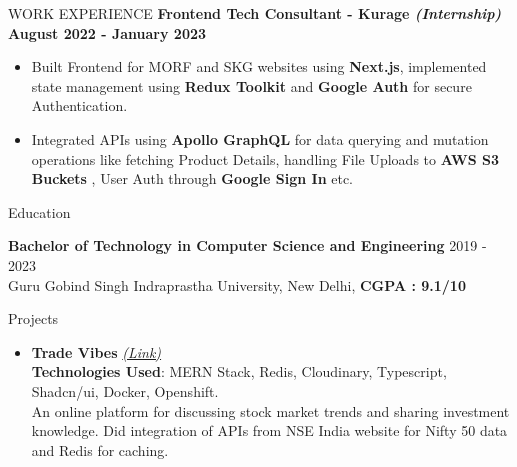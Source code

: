 \documentclass{resume} %
\begin{document}
\begin{rSection}{WORK EXPERIENCE}
{\bf Frontend Tech Consultant - Kurage {\normalfont \emph{(Internship)}}  \hfill August 2022 - January 2023 }
\begin{itemize}

    \item {\normalfont Built Frontend for MORF and SKG websites using \textbf{Next.js}, implemented state management using 
 \textbf{Redux Toolkit} and \textbf{Google Auth} for secure Authentication.}
   \item {\normalfont Integrated APIs using \textbf{{Apollo GraphQL}} for data querying and mutation operations like fetching Product Details, handling File Uploads to \textbf{AWS S3 Buckets} , User Auth through \textbf{Google Sign In} etc.} 
\end{itemize}

\end{rSection}




\begin{rSection}{Education}

{\bf Bachelor of Technology in Computer Science and Engineering} \hfill {2019 - 2023}
\\ 
{\normalfont Guru Gobind Singh Indraprastha University, New Delhi}, \textbf{CGPA : 9.1/10}

\end{rSection}




 


\begin{rSection}{Projects}
   \begin{itemize}
    \item \textbf{Trade Vibes} 
    \href{https://github.com/tushargahlaut/TradeVibes}
    {\emph{(Link)}}
    \\ \textbf{Technologies Used}: MERN Stack, Redis, Cloudinary, Typescript, Shadcn/ui, Docker, Openshift.
     \\An online platform for discussing stock market trends and sharing investment knowledge. Did integration of APIs from NSE India website for Nifty 50 data and Redis for caching.
   
   \end{itemize}
\end{rSection}
\end{document}
